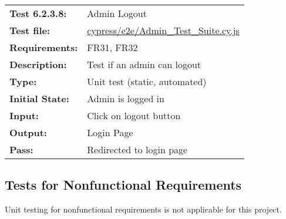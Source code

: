 \documentclass[12pt, titlepage]{article}
\begin{document}
\textcolor{red}{
\begin{center}
\begin{tabular}{|l|p{10cm}|}
    \hline
    \bf{Test} 6.2.3.8: & Admin Logout \\
    \bf{Test file: } &
    \href{https://github.com/parkd-app/park-d/blob/main/src/park-d-front-end/src/cypress/e2e/Admin_Test_Suite.cy.js}{cypress/e2e/Admin\_Test\_Suite.cy.js}\\
    \bf{Requirements}: & FR31, FR32\\
    \bf{Description}: & Test if an admin can logout\\
    \bf{Type}: & Unit test (static, automated) \\
    \bf{Initial State}: & Admin is logged in\\
    \bf{Input}: &  Click on logout button\\
    \bf{Output}: & Login Page\\
    \bf{Pass}: & Redirected to login page \\
    \hline
\end{tabular}
\end{center}}

\subsection{Tests for Nonfunctional Requirements}
Unit testing for nonfunctional requirements is not applicable for this project.


		


					
					
					
\end{document}
